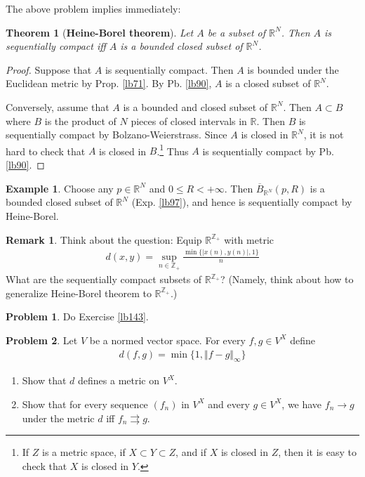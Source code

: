 \documentclass[12pt,b5paper,notitlepage]{article}
\theoremstyle{definition}
\newtheorem{eg}[df]{Example}
\newtheorem{rem}[df]{Remark}
\newtheorem{prob}{\color{red}Problem}[section]
\theoremstyle{plain}
\newtheorem{thm}[df]{Theorem}
\newcommand{\ovl}{\overline}
\newcommand{\Zbb}{\mathbb Z}
\newcommand{\Rbb}{\mathbb R}
\numberwithin{equation}{section}
\begin{document}
The above problem implies immediately:

\begin{thm}[\textbf{Heine-Borel theorem}]\label{lb98}   
Let $A$ be a subset of $\Rbb^N$. Then $A$ is sequentially compact iff $A$ is a bounded closed subset of $\Rbb^N$.
\end{thm}

\begin{proof}
Suppose that $A$ is sequentially compact. Then $A$ is bounded under the Euclidean metric by Prop. \ref{lb71}. By Pb. \ref{lb90}, $A$ is a closed subset of $\Rbb^N$.

Conversely, assume that $A$ is a bounded and closed subset of $\Rbb^N$. Then $A\subset B$ where $B$ is the product of $N$ pieces of closed intervals in $\Rbb$. Then $B$ is sequentially compact by Bolzano-Weierstrass. Since $A$ is closed in $\Rbb^N$, it is not hard to check that $A$ is closed in $B$.\footnote{If $Z$ is a metric space, if $X\subset Y\subset Z$, and if $X$ is closed in $Z$, then it is easy to check that $X$ is closed in $Y$.} Thus $A$ is sequentially compact by Pb. \ref{lb90}.
\end{proof}




\begin{eg}
Choose any $p\in \Rbb^N$ and $0\leq R<+\infty$. Then $\ovl B_{\Rbb^N}(p,R)$ is a bounded closed subset of $\Rbb^N$ (Exp. \ref{lb97}), and hence is sequentially compact by Heine-Borel.
\end{eg}

\begin{rem}
Think about the question: Equip $\Rbb^{\Zbb_+}$ with metric
\begin{align*}
d(x,y)=\sup_{n\in\Zbb_+}\frac {\min\{|x(n),y(n)|,1\}}{n}
\end{align*} 
What are the sequentially compact subsets of $\Rbb^{\Zbb_+}$? (Namely, think about how to generalize Heine-Borel theorem to $\Rbb^{\Zbb_+}$.)
\end{rem}



\begin{prob}
Do Exercise \ref{lb143}.
\end{prob}




\begin{prob}\label{lb81}
Let $V$ be a normed vector space. For every $f,g\in V^X$ define
\begin{align}
d(f,g)=\min\{1,\Vert f-g\Vert_\infty \}\label{eq55}
\end{align}
\begin{enumerate}
\item Show that $d$ defines a metric on $V^X$. 
\item Show that for every sequence $(f_n)$ in $V^X$ and every $g\in V^X$, we have $f_n\rightarrow g$ under the metric $d$ iff $f_n\rightrightarrows g$.
\end{enumerate}
\end{prob}
\end{document}
